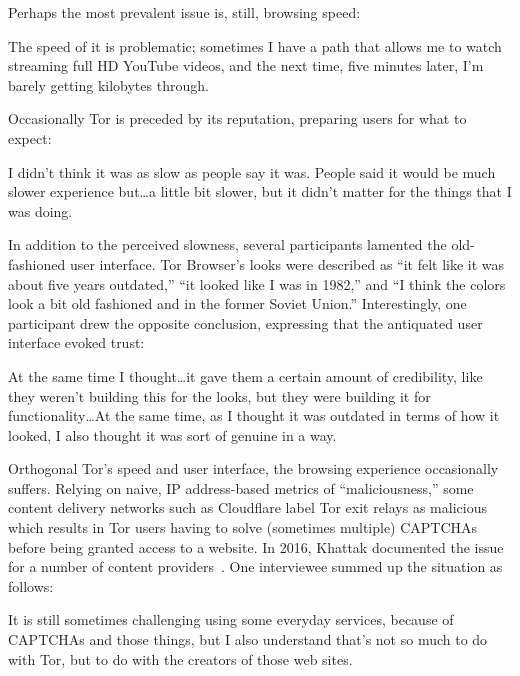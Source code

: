 Perhaps the most prevalent issue is, still, browsing speed:

\begin{displayquote}
The speed of it is problematic; sometimes I have a path that allows me to watch
streaming full HD YouTube videos, and the next time, five minutes later, I'm
barely getting kilobytes through.
\end{displayquote}

Occasionally Tor is preceded by its reputation, preparing users for what to
expect:

\begin{displayquote}
I didn't think it was as slow as people say it was. People said it would be much
slower experience but\ldots a little bit slower, but it didn't matter for the
things that I was doing.
\end{displayquote}

In addition to the perceived slowness, several participants lamented the
old-fashioned user interface.  Tor Browser's looks were described as ``it felt
like it was about five years outdated,'' ``it looked like I was in 1982,'' and
``I think the colors look a bit old fashioned and in the former Soviet Union.''
Interestingly, one participant drew the opposite conclusion, expressing that the
antiquated user interface evoked trust:

\begin{displayquote}
At the same time I thought\ldots it gave them a certain amount of credibility,
like they weren't building this for the looks, but they were building it for
functionality\ldots  At the same time, as I thought it was outdated in terms of
how it looked, I also thought it was sort of genuine in a way.
\end{displayquote}

Orthogonal Tor's speed and user interface, the browsing experience occasionally
suffers.  Relying on naive, IP address-based metrics of ``maliciousness,'' some
content delivery networks such as Cloudflare label Tor exit relays as malicious
which results in Tor users having to solve (sometimes multiple) CAPTCHAs before
being granted access to a website.  In 2016, Khattak \ea documented the issue
for a number of content providers~\cite{Khattak2016a}.  One interviewee summed
up the situation as follows:

\begin{displayquote}
It is still sometimes challenging using some everyday services, because of
CAPTCHAs and those things, but I also understand that's not so much to do with
Tor, but to do with the creators of those web sites.
\end{displayquote}

